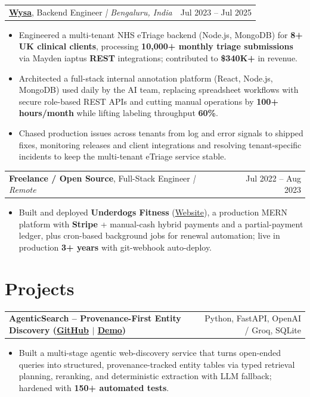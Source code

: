 \documentclass[letterpaper,11pt]{article}
\makeatletter
\newcommand{\expItem}[4]{%
  \vspace{2pt}
  \begin{tabular*}{\textwidth}{@{}l@{\extracolsep{\fill}}r@{}}
    \textbf{#1}, #2 \textit{| #3} & #4 \\
  \end{tabular*}\par\vspace{-3pt}
}
\newcommand{\projItem}[2]{%
  \vspace{2pt}
  \begin{tabular*}{\textwidth}{@{}l@{\extracolsep{\fill}}r@{}}
    \textbf{#1} & #2 \\
  \end{tabular*}\par\vspace{-3pt}
}
\makeatother
\begin{document}
\expItem{\href{https://www.wysa.io}{Wysa}}{Backend Engineer}{Bengaluru, India}{Jul 2023 -- Jul 2025}
\begin{itemize}
  \item Engineered a multi-tenant NHS eTriage backend (Node.js, MongoDB) for \textbf{8+ UK clinical clients}, processing \textbf{10{,}000+ monthly triage submissions} via Mayden iaptus \textbf{REST} integrations; contributed to \textbf{\$340K+} in revenue.
  \item Architected a full-stack internal annotation platform (React, Node.js, MongoDB) used daily by the AI team, replacing spreadsheet workflows with secure role-based REST APIs and cutting manual operations by \textbf{100+ hours/month} while lifting labeling throughput \textbf{60\%}.
  \item Chased production issues across tenants from log and error signals to shipped fixes, monitoring releases and client integrations and resolving tenant-specific incidents to keep the multi-tenant eTriage service stable.
\end{itemize}

\expItem{Freelance / Open Source}{Full-Stack Engineer}{Remote}{Jul 2022 -- Aug 2023}
\begin{itemize}
  \item Built and deployed \textbf{Underdogs Fitness} (\href{https://www.underdogsfitness.in/}{Website}), a production MERN platform with \textbf{Stripe} + manual-cash hybrid payments and a partial-payment ledger, plus cron-based background jobs for renewal automation; live in production \textbf{3+ years} with git-webhook auto-deploy.
\end{itemize}

\section{Projects}

\projItem{AgenticSearch -- Provenance-First Entity Discovery {\normalfont\small(\href{https://github.com/Deva-1903/ciir_agentic_search}{GitHub} $\vert$ \href{https://agentic-search-negglszkwa-uc.a.run.app}{Demo})}}{Python, FastAPI, OpenAI / Groq, SQLite}
\begin{itemize}
  \item Built a multi-stage agentic web-discovery service that turns open-ended queries into structured, provenance-tracked entity tables via typed retrieval planning, reranking, and deterministic extraction with LLM fallback; hardened with \textbf{150+ automated tests}.
\end{itemize}
\end{document}
